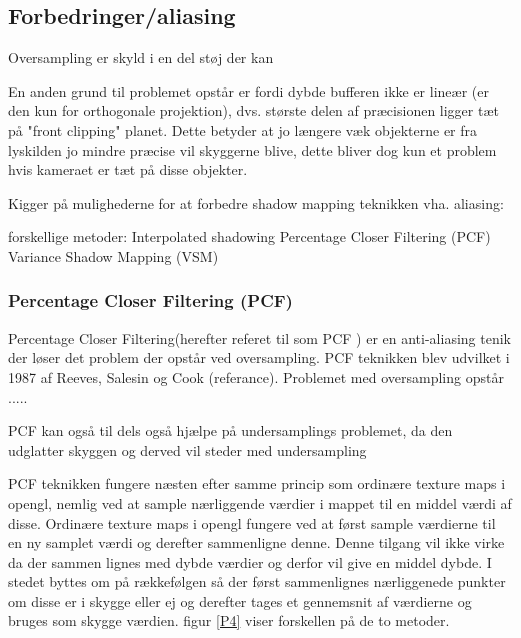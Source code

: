 \documentclass[11pt,a4paper]{article}
\begin{document}
\newpage 

\subsection{Forbedringer/aliasing}

Oversampling er skyld i en del støj der kan 


En anden grund til problemet opstår er fordi dybde bufferen ikke er lineær (er den kun for orthogonale projektion), dvs. største delen af præcisionen ligger tæt på "front clipping" planet. Dette betyder at jo længere væk objekterne er fra lyskilden jo mindre præcise vil skyggerne blive, dette bliver dog kun et problem hvis kameraet er tæt på disse objekter. 




Kigger på mulighederne for at forbedre shadow mapping teknikken vha. aliasing:

forskellige metoder:
Interpolated shadowing
Percentage Closer Filtering (PCF)
Variance Shadow Mapping (VSM)


\subsubsection{Percentage Closer Filtering (PCF)}


Percentage Closer Filtering(herefter referet til som PCF ) er en anti-aliasing tenik der løser det problem der opstår ved oversampling. PCF teknikken blev udvilket i 1987 af Reeves, Salesin og Cook (referance). 
 Problemet med oversampling opstår .....

PCF kan også til dels også hjælpe på undersamplings problemet, da den udglatter skyggen og derved vil steder med undersampling 




PCF teknikken fungere næsten efter samme princip som ordinære texture maps i opengl, nemlig ved at sample nærliggende værdier i mappet til en middel værdi af disse. Ordinære texture maps i opengl fungere ved at først sample værdierne til en ny samplet værdi og derefter sammenligne denne. Denne tilgang vil ikke virke da der sammen lignes med dybde værdier og derfor vil give en middel dybde. I stedet byttes om på rækkefølgen så  der først sammenlignes nærliggenede punkter om disse er i skygge eller ej og derefter tages et gennemsnit af værdierne og bruges som skygge værdien. figur \ref{P4} viser forskellen på de to metoder.
\end{document}

